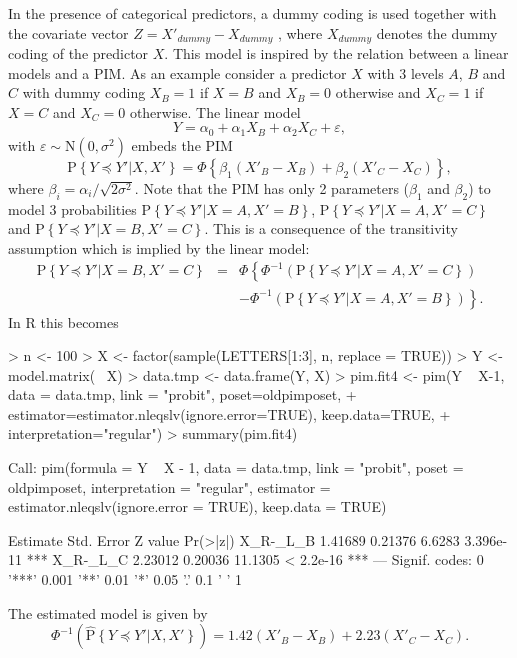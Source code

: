 \documentclass[12pt]{article}
\newcommand{\prob}[1]{\text{P}\left\{#1\right\}}
\newcommand{\hatprob}[1]{\hat{\text{P}}\left\{#1\right\}}
\newcommand{\leqs}{\preccurlyeq}
\begin{document}
In the presence of categorical predictors, a dummy coding is used together with the covariate vector $Z = X'_{dummy} - X_{dummy}$ , where $X_{dummy}$ denotes the dummy coding of the predictor $X$. This model is inspired by the relation between a linear models and a PIM. As an example consider a predictor $X$ with 3 levels $A$, $B$ and $C$ with dummy coding $X_{B} = 1$ if $X=B$ and $X_{B} = 0$ otherwise and $X_C = 1$ if $X = C$ and $X_C = 0$ otherwise. The linear model
\[
Y = \alpha_0 + \alpha_1 X_B + \alpha_2 X_C + \varepsilon,
\] 
with $\varepsilon \sim \text{N}(0,\sigma^2)$ embeds the PIM
\[
\prob{Y \leqs Y'| X, X'} = \Phi\left\{\beta_1 (X'_B - X_B) + \beta_2 (X'_C - X_C) \right\},
\]
where $\beta_i = \alpha_i/\sqrt{2 \sigma^2}$. Note that the PIM has only 2 parameters ($\beta_1$ and $\beta_2$) to model 3 probabilities $\prob{Y \leqs Y'| X = A, X' = B}$, $\prob{Y \leqs Y'| X = A, X' = C}$ and $\prob{Y \leqs Y'| X = B, X' = C}$. This is a consequence of the transitivity assumption which is implied by the linear model:
\begin{eqnarray*}
\prob{Y \leqs Y'| X = B, X' = C} &=& \Phi\left\{ \Phi^{-1} \left(\prob{Y \leqs Y'| X = A, X' = C} \right)  \right. \\
																 & & \left. 	- \Phi^{-1}\left(\prob{Y \leqs Y'| X = A, X' = B} \right) \right\}.
\end{eqnarray*}
In R this becomes
\begin{Schunk}
\begin{Sinput}
> n <- 100
> X <- factor(sample(LETTERS[1:3], n, replace = TRUE))
> Y <- model.matrix(~ X)%
> data.tmp <- data.frame(Y, X)
> pim.fit4 <- pim(Y ~ X-1, data = data.tmp, link = "probit", poset=oldpimposet, 
+ 								estimator=estimator.nleqslv(ignore.error=TRUE), keep.data=TRUE, 
+ 								interpretation="regular")
> summary(pim.fit4)
\end{Sinput}
\begin{Soutput}
Call:
pim(formula = Y ~ X - 1, data = data.tmp, link = "probit", poset = oldpimposet, 
    interpretation = "regular", estimator = estimator.nleqslv(ignore.error = TRUE), 
    keep.data = TRUE)

         Estimate Std. Error Z value  Pr(>|z|)    
X_R-_L_B  1.41689    0.21376  6.6283 3.396e-11 ***
X_R-_L_C  2.23012    0.20036 11.1305 < 2.2e-16 ***
---
Signif. codes:  0 '***' 0.001 '**' 0.01 '*' 0.05 '.' 0.1 ' ' 1 
\end{Soutput}
\end{Schunk}
The estimated model is given by
\[
\Phi^{-1}\left( \hatprob{Y \leqs Y'| X, X'} \right)= 1.42 (X'_B - X_B) + 2.23 (X'_C - X_C).
\]
\end{document}

